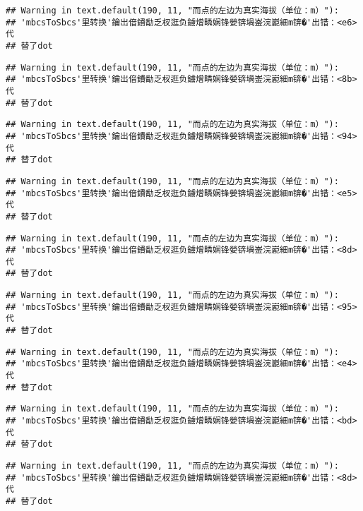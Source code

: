 \documentclass[
]{article}
\begin{document}
\begin{verbatim}
## Warning in text.default(190, 11, "而点的左边为真实海拔（单位：m）"):
## 'mbcsToSbcs'里转换'鑰岀偣鐨勫乏杈逛负鐪熷疄娴锋嫈锛堝崟浣嶏細m锛�'出错：<e6>代
## 替了dot
\end{verbatim}

\begin{verbatim}
## Warning in text.default(190, 11, "而点的左边为真实海拔（单位：m）"):
## 'mbcsToSbcs'里转换'鑰岀偣鐨勫乏杈逛负鐪熷疄娴锋嫈锛堝崟浣嶏細m锛�'出错：<8b>代
## 替了dot
\end{verbatim}

\begin{verbatim}
## Warning in text.default(190, 11, "而点的左边为真实海拔（单位：m）"):
## 'mbcsToSbcs'里转换'鑰岀偣鐨勫乏杈逛负鐪熷疄娴锋嫈锛堝崟浣嶏細m锛�'出错：<94>代
## 替了dot
\end{verbatim}

\begin{verbatim}
## Warning in text.default(190, 11, "而点的左边为真实海拔（单位：m）"):
## 'mbcsToSbcs'里转换'鑰岀偣鐨勫乏杈逛负鐪熷疄娴锋嫈锛堝崟浣嶏細m锛�'出错：<e5>代
## 替了dot
\end{verbatim}

\begin{verbatim}
## Warning in text.default(190, 11, "而点的左边为真实海拔（单位：m）"):
## 'mbcsToSbcs'里转换'鑰岀偣鐨勫乏杈逛负鐪熷疄娴锋嫈锛堝崟浣嶏細m锛�'出错：<8d>代
## 替了dot
\end{verbatim}

\begin{verbatim}
## Warning in text.default(190, 11, "而点的左边为真实海拔（单位：m）"):
## 'mbcsToSbcs'里转换'鑰岀偣鐨勫乏杈逛负鐪熷疄娴锋嫈锛堝崟浣嶏細m锛�'出错：<95>代
## 替了dot
\end{verbatim}

\begin{verbatim}
## Warning in text.default(190, 11, "而点的左边为真实海拔（单位：m）"):
## 'mbcsToSbcs'里转换'鑰岀偣鐨勫乏杈逛负鐪熷疄娴锋嫈锛堝崟浣嶏細m锛�'出错：<e4>代
## 替了dot
\end{verbatim}

\begin{verbatim}
## Warning in text.default(190, 11, "而点的左边为真实海拔（单位：m）"):
## 'mbcsToSbcs'里转换'鑰岀偣鐨勫乏杈逛负鐪熷疄娴锋嫈锛堝崟浣嶏細m锛�'出错：<bd>代
## 替了dot
\end{verbatim}

\begin{verbatim}
## Warning in text.default(190, 11, "而点的左边为真实海拔（单位：m）"):
## 'mbcsToSbcs'里转换'鑰岀偣鐨勫乏杈逛负鐪熷疄娴锋嫈锛堝崟浣嶏細m锛�'出错：<8d>代
## 替了dot
\end{verbatim}
\end{document}
